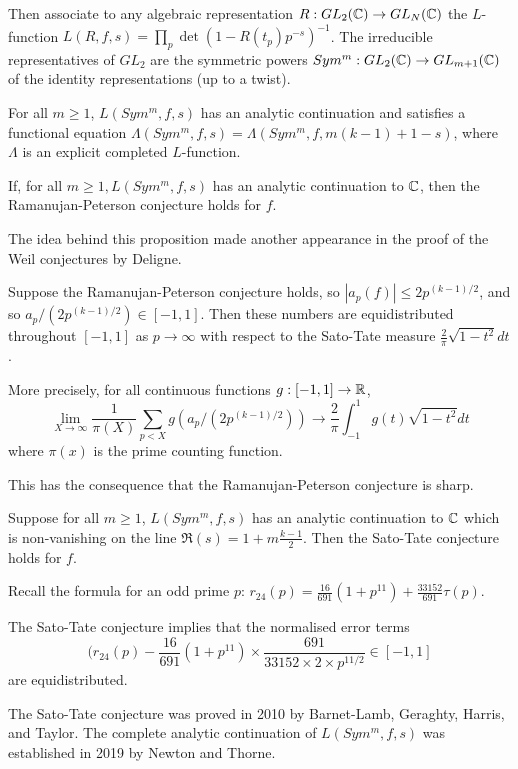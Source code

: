 \documentclass[10pt,a4paper]{article}
\begin{document}
Then associate to any algebraic representation $R: GL_2(\mathbb{C}) \to GL_N(\mathbb{C})$ the $L$-function $L(R,f,s) = \prod_p \det(1-R(t_p)p^{-s})^{-1}$. The irreducible representatives of $GL_2$ are the symmetric powers $Sym^m :GL_2(\mathbb{C}) \to GL_{m+1}(\mathbb{C})$ of the identity representations (up to a twist).
\begin{conjecture}
  For all $m \geq 1$, $L(Sym^m, f,s)$ has an analytic continuation and satisfies a functional equation $\Lambda(Sym^m, f,s) = \Lambda(Sym^m, f, m(k-1)+1-s)$, where $\Lambda$ is an explicit completed $L$-function.
\end{conjecture}
\begin{proposition}[Langlands]
  If, for all $m \geq 1, L(Sym^m, f,s)$ has an analytic continuation to $\mathbb{C}$, then the Ramanujan-Peterson conjecture holds for $f$.
\end{proposition}
The idea behind this proposition made another appearance in the proof of the Weil conjectures by Deligne.
\begin{conjecture}
  Suppose the Ramanujan-Peterson conjecture holds, so $|a_p(f)| \leq 2p^{(k-1)/2}$, and so $a_p/(2p^{(k-1)/2}) \in [-1,1]$. Then these numbers are equidistributed throughout $[-1,1]$ as $p \to \infty$ with respect to the Sato-Tate measure $\frac{2}{\pi}\sqrt{1-t^2}dt$.

  More precisely, for all continuous functions $g:[-1,1]\to \mathbb{R}$,
  \[\lim_{X\to \infty}\frac{1}{\pi(X)}\sum_{p < X} g(a_p/(2p^{(k-1)/2})) \to \frac{2}{\pi}\int_{-1}^1 g(t)\sqrt{1-t^2}dt\]
  where $\pi(x)$ is the prime counting function.

  This has the consequence that the Ramanujan-Peterson conjecture is sharp.
\end{conjecture}
\begin{proposition}[Serre]
  Suppose for all $m \geq 1$, $L(Sym^m,f,s)$ has an analytic continuation to $\mathbb{C}$ which is non-vanishing on the line $\Re(s) = 1+m\frac{k-1}{2}$. Then the Sato-Tate conjecture holds for $f$.
\end{proposition}
Recall the formula for an odd prime $p$: $r_{24}(p) = \frac{16}{691}(1+p^{11})+\frac{33152}{691}\tau(p)$.

The Sato-Tate conjecture implies that the normalised error terms
\[(r_{24}(p) - \frac{16}{691}(1+p^{11})\times \frac{691}{33152 \times 2 \times p^{11/2}} \in [-1,1]\]
are equidistributed.

The Sato-Tate conjecture was proved in 2010 by Barnet-Lamb, Geraghty, Harris, and Taylor. The complete analytic continuation of $L(Sym^m, f,s)$ was established in 2019 by Newton and Thorne.
\end{document}
